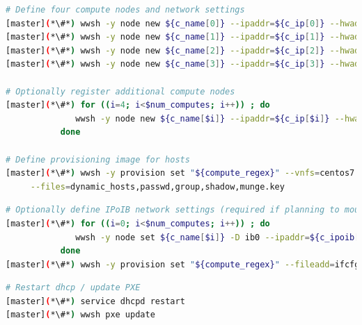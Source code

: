 \documentclass[letterpaper]{article}
\begin{document}
\begin{lstlisting}[language=bash,keywords={},upquote=true,basicstyle=\footnotesize\ttfamily,]
# Define four compute nodes and network settings 
[master](*\#*) wwsh -y node new ${c_name[0]} --ipaddr=${c_ip[0]} --hwaddr=${c_mac[0]} -D ${eth_provision}
[master](*\#*) wwsh -y node new ${c_name[1]} --ipaddr=${c_ip[1]} --hwaddr=${c_mac[1]} -D ${eth_provision}
[master](*\#*) wwsh -y node new ${c_name[2]} --ipaddr=${c_ip[2]} --hwaddr=${c_mac[2]} -D ${eth_provision}
[master](*\#*) wwsh -y node new ${c_name[3]} --ipaddr=${c_ip[3]} --hwaddr=${c_mac[3]} -D ${eth_provision}

# Optionally register additional compute nodes
[master](*\#*) for ((i=4; i<$num_computes; i++)) ; do
              wwsh -y node new ${c_name[$i]} --ipaddr=${c_ip[$i]} --hwaddr=${c_mac[$i]} -D ${eth_provision}
           done

# Define provisioning image for hosts
[master](*\#*) wwsh -y provision set "${compute_regex}" --vnfs=centos7.1 --bootstrap=`uname -r` \
     --files=dynamic_hosts,passwd,group,shadow,munge.key 
\end{lstlisting}

\begin{lstlisting}[language=bash,keywords={},upquote=true,basicstyle=\footnotesize\ttfamily]
# Optionally define IPoIB network settings (required if planning to mount Lustre over IB)
[master](*\#*) for ((i=0; i<$num_computes; i++)) ; do
              wwsh -y node set ${c_name[$i]} -D ib0 --ipaddr=${c_ipoib[$i]} --netmask=${ipoib_netmask}
           done
[master](*\#*) wwsh -y provision set "${compute_regex}" --fileadd=ifcfg-ib0.ww
\end{lstlisting}

\begin{lstlisting}[language=bash,keywords={},upquote=true,basicstyle=\footnotesize\ttfamily]
# Restart dhcp / update PXE
[master](*\#*) service dhcpd restart
[master](*\#*) wwsh pxe update
\end{lstlisting}


\end{document}
